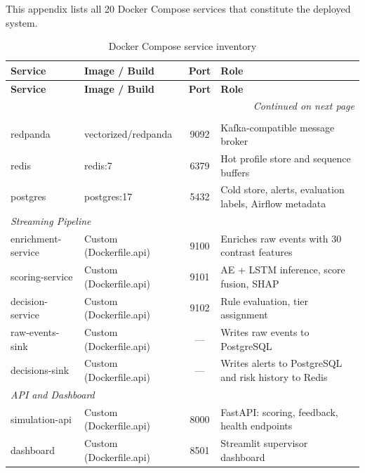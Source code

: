 This appendix lists all 20 Docker Compose services that constitute the
deployed system.

\begin{longtable}{@{}llcp{5cm}@{}}
\caption{Docker Compose service inventory}
\label{tab:docker-services} \\
\toprule
\textbf{Service} & \textbf{Image / Build} & \textbf{Port} & \textbf{Role} \\
\midrule
\endfirsthead
\toprule
\textbf{Service} & \textbf{Image / Build} & \textbf{Port} & \textbf{Role} \\
\midrule
\endhead
\midrule
\multicolumn{4}{r}{\textit{Continued on next page}} \\
\endfoot
\bottomrule
\endlastfoot

\multicolumn{4}{l}{\textit{Infrastructure}} \\
\midrule
redpanda          & vectorized/redpanda      & 9092  & Kafka-compatible message broker \\
redis             & redis:7                  & 6379  & Hot profile store and sequence buffers \\
postgres          & postgres:17              & 5432  & Cold store, alerts, evaluation labels, Airflow metadata \\
\midrule

\multicolumn{4}{l}{\textit{Streaming Pipeline}} \\
\midrule
enrichment-service & Custom (Dockerfile.api) & 9100  & Enriches raw events with 30 contrast features \\
scoring-service    & Custom (Dockerfile.api) & 9101  & AE + LSTM inference, score fusion, SHAP \\
decision-service   & Custom (Dockerfile.api) & 9102  & Rule evaluation, tier assignment \\
raw-events-sink    & Custom (Dockerfile.api) & ---   & Writes raw events to PostgreSQL \\
decisions-sink     & Custom (Dockerfile.api) & ---   & Writes alerts to PostgreSQL and risk history to Redis \\
\midrule

\multicolumn{4}{l}{\textit{API and Dashboard}} \\
\midrule
simulation-api     & Custom (Dockerfile.api) & 8000  & FastAPI: scoring, feedback, health endpoints \\
dashboard          & Custom (Dockerfile.api) & 8501  & Streamlit supervisor dashboard \\
\midrule


\end{longtable}
